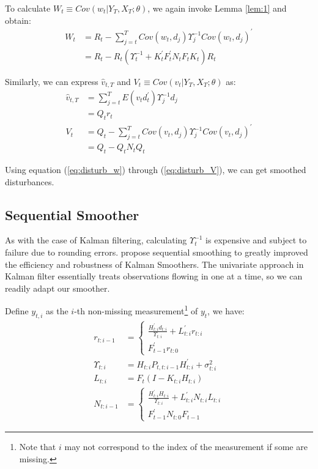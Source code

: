 \documentclass[12pt]{article}
\numberwithin{equation}{section}
\begin{document}
To calculate $W_t \equiv Cov(w_t|Y_T,X_T;\theta)$, we again invoke Lemma \ref{lem:1} and obtain:
\begin{align}
    W_t &= R_t - \sum_{j=t}^TCov(w_t,d_j)\Upsilon_j^{-1}Cov(w_t,d_j)^{'} \nonumber \\
    &= R_t - R_t(\Upsilon_t^{-1}+K_t^{'}F_t^{'}N_tF_tK_t)R_t \label{eq:disturb_W}
\end{align}

Similarly, we can express $\hat{v}_{t,T}$ and $V_t \equiv Cov(v_t|Y_T,X_T;\theta)$ as:
\begin{align}
    \hat{v}_{t,T} &= \sum_{j=t}^{T}E(v_td_t^{'})\Upsilon_j^{-1}d_j \nonumber \\
    &= Q_tr_t \label{eq:disturb_v} \\
    V_t &= Q_t - \sum_{j=t}^{T}Cov(v_t, d_j)\Upsilon_j^{-1}Cov(v_t,d_j)^{'} \nonumber \\
    &= Q_t - Q_tN_tQ_t \label{eq:disturb_V}
\end{align}

Using equation (\ref{eq:disturb_w}) through (\ref{eq:disturb_V}), we can get smoothed disturbances.

\subsection{Sequential Smoother}
As with the case of Kalman filtering, calculating $\Upsilon_t^{-1}$ is expensive and subject to failure due to rounding errors. \cite{durbin_koopman_2000} propose sequential smoothing to greatly improved the efficiency and robustness of Kalman Smoothers. The univariate approach in Kalman filter essentially treats observations flowing in one at a time, so we can readily adapt our smoother.

Define $y_{t,i}$ as the $i$-th non-missing measurement\footnote{Note that $i$ may not correspond to the index of the measurement if some are missing.} of $y_t$, we have:
\begin{align}
    r_{t:i-1} &= \begin{cases}
        \frac{H_{t:i}^{'}d_{t:i}}{\Upsilon_{t:i}} + L_{t:i}^{'}r_{t:i} \\
        F_{t-1}^{'}r_{t:0} 
    \end{cases} \label{eq:seq_r} \\
    \Upsilon_{t:i} &= H_{t:i}P_{t,t:i-1}H_{t:i}^{'}+\sigma_{t:i}^2 \nonumber \\
    L_{t:i} &= F_t(I-K_{t:i}H_{t:i}) \nonumber \\
    N_{t:i-1} &= \begin{cases}
        \frac{H_{t:i}^{'}H_{t:i}}{\Upsilon_{t:i}} + L_{t:i}^{'}N_{t:i}L_{t:i} \\
        F_{t-1}^{'}N_{t:0}F_{t-1}
    \end{cases} \label{eq:N_seq}
\end{align}
\end{document}
